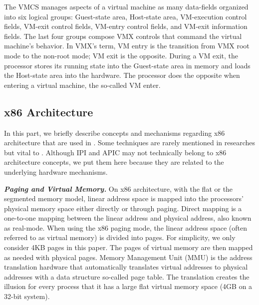 The VMCS manages aspects of a virtual machine as many data-fields organized into six logical groups: Guest-state area, Host-state area, VM-execution control fields, VM-exit control fields, VM-entry control fields, and VM-exit information fields. The last four groups compose VMX controls that command the virtual machine's behavior. In VMX's term, VM entry is the transition from VMX root mode to the non-root mode; VM exit is the opposite. During a VM exit, the processor stores its running state into the Guest-state area in memory and loads the Host-state area into the hardware. The processor does the opposite when entering a virtual machine, the so-called VM enter.


\subsection{x86 Architecture}

In this part, we briefly describe concepts and mechanisms regarding x86 architecture that are used in \name. Some techniques are rarely mentioned in researches but vital to \name. Although IPI and APIC may not technically belong to x86 architecture concepts, we put them here because they are related to the underlying hardware mechanisms.


\textbf{\textit{Paging and Virtual Memory.}} On x86 architecture, with the flat or the segmented memory model, linear address space is mapped into the processors' physical memory space either directly or through paging.  Direct mapping is a one-to-one mapping between the linear address and physical address, also known as real-mode. When using the x86 paging mode, the linear address space (often referred to as virtual memory) is divided into pages. For simplicity, we only consider 4KB pages in this paper. The pages of virtual memory are then mapped as needed with physical pages. Memory Management Unit (MMU) is the address translation hardware that automatically translates virtual addresses to physical addresses with a data structure so-called page table. The translation creates the illusion for every process that it has a large flat virtual memory space (4GB on a 32-bit system). 



